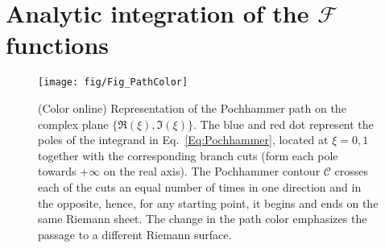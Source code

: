 \section{Analytic integration of the ${\mathcal{F}}$ functions}\label{App:IntegrationFF}

\begin{figure}[t!]
	\texttt{[image: fig/Fig\_PathColor]}
	\caption{(Color online)
		Representation of the Pochhammer path on the complex plane $\{\Re(\xi),\Im(\xi)\}$.
		The blue and red dot represent the poles of the integrand in Eq.~\eqref{Eq:Pochhammer}, located at $\xi=0,1$ together with the corresponding branch cuts (form each pole towards $+\infty$ on the real axis).
		The Pochhammer contour $\mathcal{C}$ crosses each of the cuts an equal number of times in one direction and in the opposite, hence, for any starting point, it begins and ends on the same Riemann sheet.
		The change in the path color emphasizes the passage to a different Riemann surface.}
	\label{fig:Poch}
\end{figure}

